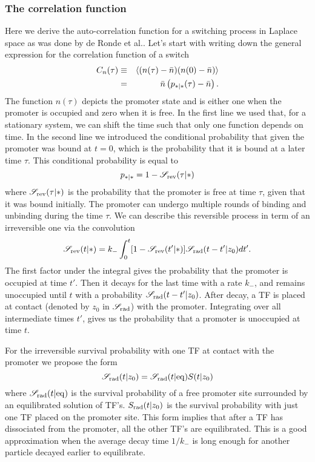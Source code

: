 \subsubsection{The correlation function}
Here we derive the auto-correlation function for a switching process in Laplace space as was done by de Ronde et al.\cite{DeRonde2012}. Let's start with writing down the general expression for the correlation function of a switch
\begin{eqnarray}
 C_n(\tau) & \equiv & \left\langle (n(\tau) - \bar{n})(n(0) - \bar{n}) \right\rangle \\
  	& = & \bar{n} \left( p_{*|*}(\tau)-\bar{n} \right).
 \elabel{corr_func}
\end{eqnarray}
The function $n(\tau)$ depicts the promoter state and is either one when the promoter is occupied and zero when it is free. In the first line we used that, for a stationary system, we can shift the time such that only one function depends on time. In the second line we introduced the conditional probability that given the promoter was bound at $t=0$, which is the probability that it is bound at a later time $\tau$. This conditional probability is equal to
\begin{equation}
 p_{*|*} = 1 - \mathscr{S}_{\rm rev}(\tau|*)
\end{equation}
where $\mathscr{S}_{\rm rev}(\tau|*)$ is the probability that the promoter is free at time $\tau$, given that it was bound initially. The promoter can undergo multiple rounds of binding and unbinding during the time $\tau$. We can describe this reversible process in term of an irreversible one via the convolution \cite{Agmon1990}
\begin{equation}
 \mathscr{S}_{\rm rev}(t|*) = k_- \int_0^t [1-\mathscr{S}_{\rm rev}(t'|*)]\mathscr{S}_{\rm rad}(t-t'|z_0)dt'.
 \elabel{rev_conv}
\end{equation}
The first factor under the integral gives the probability that the promoter is occupied at time $t'$. Then it decays for the last time with a rate $k_-$, and remains unoccupied until $t$ with a probability $\mathscr{S}_{\rm rad}(t-t'|z_0)$. After decay, a TF is placed at contact (denoted by $z_0$ in $\mathscr{S}_{\rm rad}$) with the promoter. Integrating over all intermediate times $t'$, gives us the probability that a promoter is unoccupied at time $t$. 

For the irreversible survival probability with one TF at contact with the promoter we propose the form
\begin{equation}
 \mathscr{S}_{\rm rad}(t|z_0) = \mathscr{S}_{\rm rad}(t|{\rm eq}) S(t|z_0)
 \elabel{Def_Ssi}
\end{equation}
where $\mathscr{S}_{\rm rad}(t|{\rm eq})$ is the survival probability of a free promoter site surrounded by an equilibrated solution of TF's. $S_{\rm rad}(t|z_0)$ is the survival probability with just one TF placed on the promoter site. This form implies that after a TF has dissociated from the promoter, all the other TF's are equilibrated. This is a good approximation when the average decay time $1/k_-$ is long enough for another particle decayed earlier to equilibrate. 

